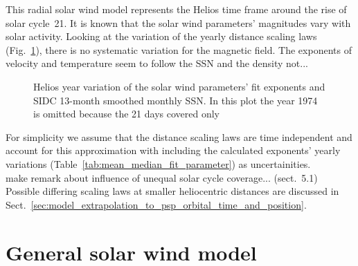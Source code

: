 This radial solar wind model represents the Helios time frame around the rise of solar cycle~21. It is known that the solar wind parameters' magnitudes vary with solar activity. Looking at the variation of the yearly distance scaling laws (Fig.~\ref{fig:yearly_gradients_b}), there is no systematic variation for the magnetic field. The exponents of velocity and temperature seem to follow the SSN and the density not...
\begin{figure}
	\caption{Helios year variation of the solar wind parameters' fit exponents and SIDC 13-month smoothed monthly SSN. In this plot the year 1974 is omitted because the 21 days covered only }
	\label{fig:yearly_gradients_b}
\end{figure}

For simplicity we assume that the distance scaling laws are time independent and account for this approximation with including the calculated exponents' yearly variations (Table~\ref{tab:mean_median_fit_parameter}) as uncertainities.\\

make remark about influence of unequal solar cycle coverage... (sect.~5.1)\\

Possible differing scaling laws at smaller heliocentric distances are discussed in Sect.~\ref{sec:model_extrapolation_to_psp_orbital_time_and_position}.


\section{General solar wind model}
\label{sec:general_solar_wind_model}


